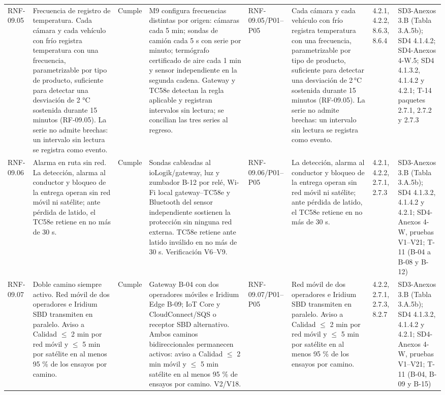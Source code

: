 \documentclass[oficio,firma,final]{lafrox}
\begin{document}
\begin{landscape}
{\begin{longtable}{@{}F{0.054} F{0.173} F{0.061} F{0.191} F{0.106} F{0.180} F{0.067} F{0.168}@{}}
  RNF-09.05 & Frecuencia de registro de temperatura. Cada cámara y cada vehículo con frío registra temperatura con una frecuencia, parametrizable por tipo de producto, suficiente para detectar una desviación de 2 °C sostenida durante 15 minutos (RF-09.05). La serie no admite brechas: un intervalo sin lectura se registra como evento. & Cumple & M9 configura frecuencias distintas por origen: cámaras cada 5 min; sondas de camión cada 5 s con serie por minuto; termógrafo certificado de aire cada 1 min y sensor independiente en la segunda cadena. Gateway y TC58e detectan la regla aplicable y registran intervalos sin lectura; se concilian las tres series al regreso. & RNF-09.05/\allowbreak{}P01--\allowbreak{}P05 & Cada cámara y cada vehículo con frío registra temperatura con una frecuencia, parametrizable por tipo de producto, suficiente para detectar una desviación de 2\,°C sostenida durante 15 minutos (RF-09.05). La serie no admite brechas: un intervalo sin lectura se registra como evento. & 4.2.1, 4.2.2, 8.6.3, 8.6.4 & SD3-Anexos 3.B (Tabla 3.A.5b); SD4 4.1.4.2; SD4-Anexos 4-W.5; SD4 4.1.3.2, 4.1.4.2 y 4.2.1; T-14 paquetes 2.7.1, 2.7.2 y 2.7.3  \\
  RNF-09.06 & Alarma en ruta sin red. La detección, alarma al conductor y bloqueo de la entrega operan sin red móvil ni satélite; ante pérdida de latido, el TC58e retiene en no más de 30 s. & Cumple & Sondas cableadas al ioLogik/gateway, luz y zumbador B-12 por relé, Wi-Fi local gateway–TC58e y Bluetooth del sensor independiente sostienen la protección sin ninguna red externa. TC58e retiene ante latido inválido en no más de 30 s. Verificación V6–V9. & RNF-09.06/\allowbreak{}P01--\allowbreak{}P05 & La detección, alarma al conductor y bloqueo de la entrega operan sin red móvil ni satélite; ante pérdida de latido, el TC58e retiene en no más de 30 s. & 4.2.1, 4.2.2, 2.7.1, 2.7.3 & SD3-Anexos 3.B (Tabla 3.A.5b); SD4 4.1.3.2, 4.1.4.2 y 4.2.1; SD4-Anexos 4-W, pruebas V1–V21; T-11 (B-04 a B-08 y B-12)  \\
  RNF-09.07 & Doble camino siempre activo. Red móvil de dos operadores e Iridium SBD transmiten en paralelo. Aviso a Calidad $\leq$ 2 min por red móvil y $\leq$ 5 min por satélite en al menos 95 \% de los ensayos por camino. & Cumple & Gateway B-04 con dos operadores móviles e Iridium Edge B-09; IoT Core y CloudConnect/SQS o receptor SBD alternativo. Ambos caminos bidireccionales permanecen activos: aviso a Calidad $\leq$ 2 min móvil y $\leq$ 5 min satélite en al menos 95 \% de ensayos por camino. V2/V18. & RNF-09.07/\allowbreak{}P01--\allowbreak{}P05 & Red móvil de dos operadores e Iridium SBD transmiten en paralelo. Aviso a Calidad $\leq$ 2 min por red móvil y $\leq$ 5 min por satélite en al menos 95 \% de los ensayos por camino. & 4.2.2, 2.7.1, 2.7.3, 8.2.7 & SD3-Anexos 3.B (Tabla 3.A.5b); SD4 4.1.3.2, 4.1.4.2 y 4.2.1; SD4-Anexos 4-W, pruebas V1–V21; T-11 (B-04, B-09 y B-15)  \\

\end{longtable}}
\end{landscape}
\end{document}

